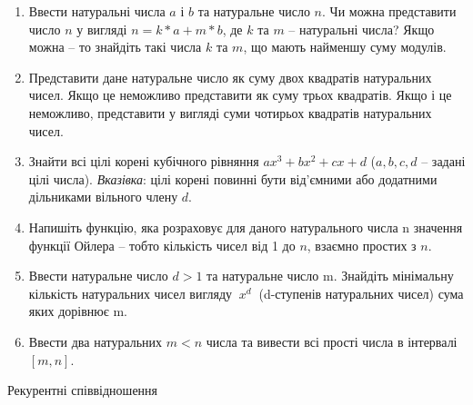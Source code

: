 \documentclass[]{article}
\begin{document}
\begin{enumerate}
\item
  Ввести натуральні числа $a$ і $b$ та натуральне число $n$. Чи можна
  представити число $n$ у вигляді $n= k*a + m*b$, де $k$ та $m$ -- натуральні
  числа? Якщо можна -- то знайдіть такі числа $k$ та $m$, що мають найменшу
  суму модулів.
\item
Представити дане натуральне число як суму двох квадратів натуральних
чисел. Якщо це неможливо представити як суму трьох квадратів. Якщо і це
неможливо, представити у вигляді суми чотирьох квадратів натуральних
чисел.
\item
 Знайти всі цілі корені кубічного рівняння $ax^3 + bx^2 + cx + d$ ($a,b,c,d$ 
-- задані цілі числа). \emph{Вказівка}: цілі корені повинні бути від'ємними
 або додатними дільниками вільного члену $d$.
\item
  Напишіть функцію, яка розраховує для даного натурального числа n
  значення функції Ойлера -- тобто кількість чисел від 1 до $n$, взаємно простих з
  $n$.
\item
Ввести натуральне число \(d > 1\) та натуральне число m. Знайдіть
мінімальну кількість натуральних чисел вигляду \(\ x^{d}\ \) (d-ступенів
натуральних чисел) сума яких дорівнює m.

\item
Ввести два натуральних $m<n$ числа та вивести всі прості числа в інтервалі $[m,n]$.


\end{enumerate}

Рекурентні співвідношення
\end{document}
